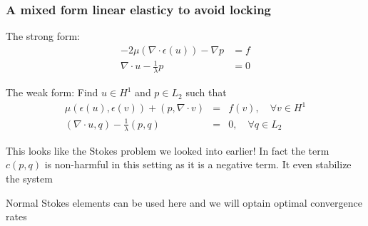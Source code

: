 \begin{frame}
\frametitle{A mixed form linear elasticy to avoid locking}

The strong form: 
\begin{align}
-2 \mu (\nabla \cdot \epsilon (u)) -\nabla p &= f \\
\nabla\cdot u - \frac{1}{\lambda} p &= 0 
\end{align}

The weak form: 
Find $u\in H^1$ and $p \in L_2$ such that
\begin{eqnarray*}
 \mu (\epsilon(u), \epsilon(v)) + (p, \nabla \cdot  v) &=& f(v), \quad \forall v\in H^1 \\
(\nabla \cdot u, q) - \frac{1}{\lambda}(p, q) &=& 0, \quad \forall q \in L_2
\end{eqnarray*}

This looks like the Stokes problem we looked into earlier! 
In fact the term $c(p,q)$ is non-harmful in this setting 
as it is a negative term. It even stabilize the system 

\vspace{0.3cm}
Normal Stokes elements can be used here and we will optain optimal convergence rates 
\end{frame}
